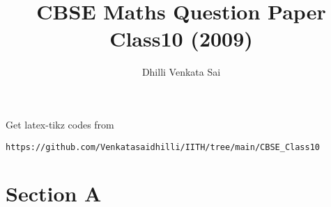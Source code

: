 \documentclass[journal,12pt,twocolumn]{IEEEtran}
\begin{document}
     \def\rightbox#1{\makebox[0in][r]{#1}}
     \def\centbox#1{\makebox[0in]{#1}}
     \def\topbox#1{\raisebox{-\baselineskip}[0in][0in]{#1}}
     \def\midbox#1{\raisebox{-0.5\baselineskip}[0in][0in]{#1}}
\vspace{3cm}
\title{CBSE Maths Question Paper Class10 (2009)}
\author{Dhilli Venkata Sai}
\maketitle
\newpage
\bigskip
\renewcommand{\thefigure}{\theenumi}
\renewcommand{\thetable}{\theenumi}
\renewcommand{\angle}{\measuredangle}
%
Get latex-tikz codes from 
%
\begin{lstlisting}
https://github.com/Venkatasaidhilli/IITH/tree/main/CBSE_Class10
\end{lstlisting}
\section{\textbf{Section A}}
\end{document}
